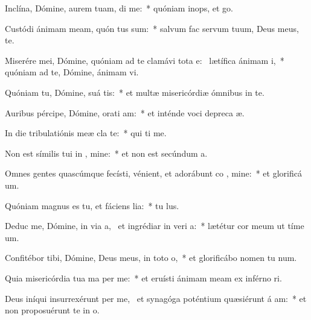 \item Inclína, Dómine, aurem tuam,  di me:~* quóniam inops, et   go.
\item Custódi ánimam meam, quón tus sum:~* salvum fac servum tuum, Deus meus,   te.
\item Miserére mei, Dómine, quóniam ad te clamávi tota e:~\pscross{} lætífica ánimam  i,~* quóniam ad te, Dómine, ánimam  vi.
\item Quóniam tu, Dómine, suá  tis:~* et multæ misericórdiæ ómnibus in te.
\item Auribus pércipe, Dómine, orati am:~* et inténde voci depreca æ.
\item In die tribulatiónis meæ cla  te:~* qui ti me.
\item Non est símilis tui in , mine:~* et non est secúndum  a.
\item Omnes gentes quascúmque fecísti, vénient, et adorábunt co , mine:~* et glorificá  um.
\item Quóniam magnus es tu, et fáciens lia:~* tu   lus.
\item Deduc me, Dómine, in via a,~\pscross{} et ingrédiar in veri a:~* lætétur cor meum ut tíme  um.
\item Confitébor tibi, Dómine, Deus meus, in toto  o,~* et glorificábo nomen tu  num.
\item Quia misericórdia tua ma  per me:~* et eruísti ánimam meam ex inférno ri.
\item Deus iníqui insurrexérunt per me,~\pscross{} et synagóga poténtium quæsiérunt á am:~* et non proposuérunt te in  o.
